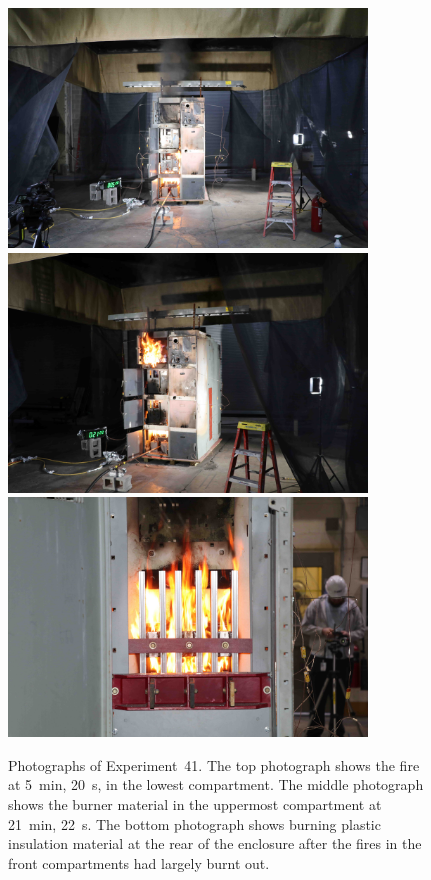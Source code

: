 \begin{figure}[p]
\centering
\includegraphics[height=2.50in]{../FIGURES/Test_41_5_min_20_s} \\
\includegraphics[height=2.50in]{../FIGURES/Test_41_21_min_22_s} \\
\includegraphics[height=2.50in]{../FIGURES/Test_41_rear}
\caption[Photographs of Experiment~41]{Photographs of Experiment~41. The top photograph shows the fire at 5~min, 20~s, in the lowest compartment. The middle photograph shows the burner material in the uppermost compartment at 21~min, 22~s. The bottom photograph shows burning plastic insulation material at the rear of the enclosure after the fires in the front compartments had largely burnt out. }
\label{fig:Test_41_photos}
\end{figure}






